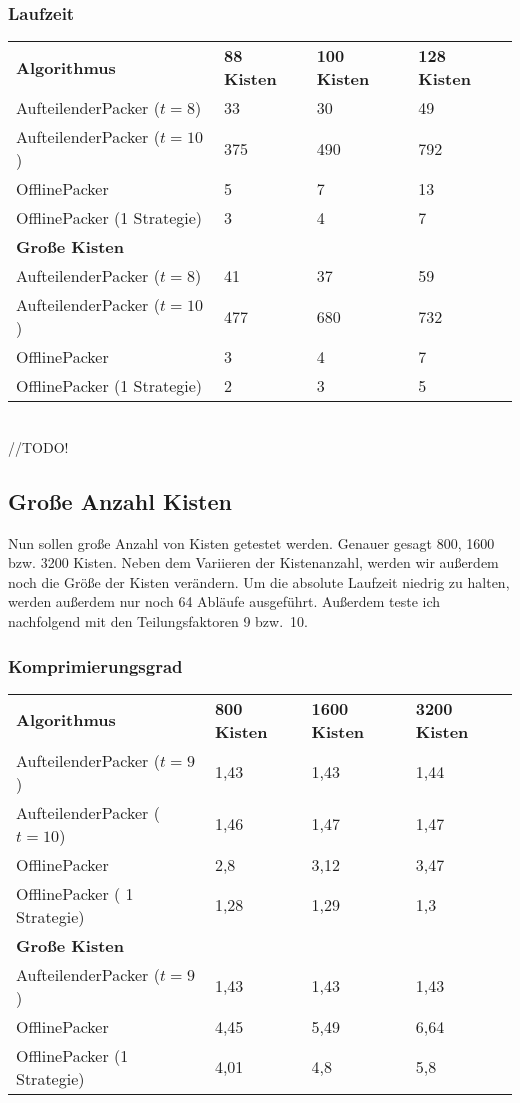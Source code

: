 \subsubsection*{Laufzeit}
\begin{tabular}{llll}
\textbf{Algorithmus} 	& \textbf{88 Kisten} 	& \textbf{100 Kisten} 	& \textbf{128 Kisten} 	\\
 AufteilenderPacker ($t=8$)  	& 33		& 30			& 49			\\
 AufteilenderPacker ($t=10$)  	& 375		& 490			& 792			\\
 OfflinePacker			& 5		& 7			& 13			\\
 OfflinePacker (1 Strategie)	& 3		& 4			& 7		\vspace*{.48em} \\
\textbf{Große Kisten} & & & \\
 AufteilenderPacker ($t=8$)  	& 41		& 37			& 59			\\
 AufteilenderPacker ($t=10$)	& 477		& 680			& 732			\\
 OfflinePacker			& 3		& 4			& 7			\\
 OfflinePacker (1 Strategie)	& 2		& 3			& 5			\\
\end{tabular}\\

  //TODO!

\subsection{Große Anzahl Kisten}
 Nun sollen große Anzahl von Kisten getestet werden. Genauer gesagt 800, 1600 bzw. 3200 Kisten.
 Neben dem Variieren der Kistenanzahl, werden wir außerdem noch die Größe der Kisten verändern.
 Um die absolute Laufzeit niedrig zu halten, werden außerdem nur noch 64 Abläufe ausgeführt.
 Außerdem teste ich nachfolgend mit den Teilungsfaktoren 9 bzw.\ 10.

\subsubsection*{Komprimierungsgrad}
\begin{tabular}{llll}
\textbf{Algorithmus} 	& \textbf{800 Kisten} 	& \textbf{1600 Kisten} 	& \textbf{3200 Kisten} 	\\
 AufteilenderPacker ($t=9$)  	& 1,43		& 1,43			& 1,44			\\
 AufteilenderPacker ($t=10$)  	& 1,46		& 1,47			& 1,47			\\
 OfflinePacker			& 2,8		& 3,12			& 3,47			\\
 OfflinePacker ( 1 Strategie)	& 1,28		& 1,29			& 1,3		\vspace*{.48em} \\
\textbf{Große Kisten} & & & \\
 AufteilenderPacker ($t=9$)  	& 1,43		& 1,43			& 1,43			\\
 OfflinePacker			& 4,45		& 5,49			& 6,64			\\
 OfflinePacker (1 Strategie)	& 4,01		& 4,8			& 5,8			\\
\end{tabular} \\

